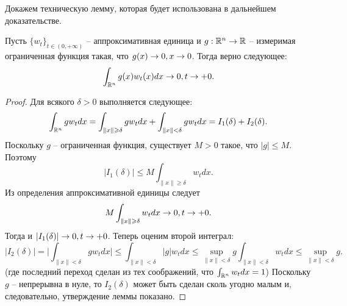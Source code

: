 Докажем техническую лемму, которая будет использована в дальнейшем доказательстве.
    \begin{lemma}
        Пусть $\{w_t\}_{t \in (0, +\infty)}$ -- аппроксимативная единица и $g: \mathbb{R}^n \to \mathbb{R}$ -- измеримая ограниченная функция такая, что $g(x) \rightarrow 0, x \rightarrow 0$.
        Тогда верно следующее:
        \[
            \int_{\mathbb{R}^n} g(x)w_t(x)dx \rightarrow 0, t \rightarrow +0.
        \]
    \end{lemma}
    \begin{proof}
        Для всякого $\delta > 0$ выполняется следующее:
        \[
            \int_{\mathbb{R}^n} gw_t dx = \int_{\|x\| \geqslant \delta} gw_t dx + \int_{\|x\| < \delta} gw_t dx = I_1(\delta) + I_2(\delta).
        \]
        Поскольку $g$ -- ограниченная функция, существует $M > 0$ такое, что $|g| \leq M$.
        Поэтому
        \[
            |I_1(\delta)| \leq M \int_{\|x\| \geq \delta} w_t dx.
        \]
        Из определения аппроксимативной единицы следует
        \[
            M \int_{\|x\| \geqslant \delta} w_t dx \rightarrow 0, t \rightarrow  +0.
        \]
        Тогда и $|I_1(\delta)| \rightarrow 0, t \rightarrow +0$.
        Теперь оценим второй интеграл:
        \[
            |I_2(\delta)| = \biggr|\int_{\|x\| < \delta}g w_t dx\biggr| \leq \int_{\|x\| < \delta} |g|w_t dx \leq \sup\limits_{\|x\| < \delta} g \int_{\|x\| < \delta} w_t dx \leq \sup\limits_{\|x\| < \delta} g.
        \]
        (где последний переход сделан из тех соображений, что $\int_{\mathbb{R}^n} w_t dx = 1$)
        Поскольку $g$ -- непрерывна в нуле, то $I_2(\delta)$ может быть сделан сколь угодно малым и, следовательно, утверждение леммы показано.
    \end{proof}

